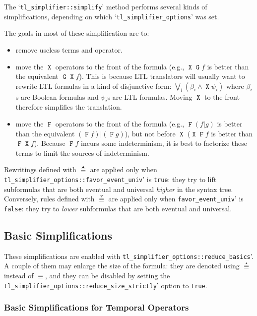 \documentclass[a4paper,twoside,10pt,DIV=12]{scrreprt}
\DeclareMathOperator{\F}{\texttt{F}}
\DeclareMathOperator{\G}{\texttt{G}}
\DeclareMathOperator{\X}{\texttt{X}}
\newcommand{\OR}{\mathbin{\texttt{|}}}
\newcommand{\0}{\texttt{0}}
\newcommand{\1}{\texttt{1}}
\newcommand{\equiV}{\stackrel{\star}{\equiv}}
\newcommand{\equivEU}{\stackrel{\blacktriangleup}{\equiv}}
\newcommand{\equivNeu}{\stackrel{\smalltriangledown}{\equiv}}
\begin{document}
The `\verb|tl_simplifier::simplify|' method performs several kinds of
simplifications, depending on which `\verb|tl_simplifier_options|'
was set.

The goals in most of these simplification are to:
\begin{itemize}
\item remove useless terms and operator.
\item move the $\X$ operators to the front of the formula (e.g., $\X\G
  f$ is better than the equivalent $\G\X f$).  This is because LTL
  translators will usually want to rewrite LTL formulas in
  a kind of disjunctive form: $\displaystyle\bigvee_i
  \left(\beta_i\land\X\psi_i\right)$ where $\beta_i$s are Boolean
  formulas and $\psi_i$s are LTL formulas.  Moving $\X$ to the
  front therefore simplifies the translation.
\item move the $\F$ operators to the front of the formula (e.g., $\F(f
  \OR g)$ is better than the equivalent $(\F f)\OR (\F g)$), but not
  before $\X$ ($\X\F f$ is better than $\F\X f$).  Because $\F f$
  incurs some indeterminism, it is best to factorize these terms to
  limit the sources of indeterminism.
\end{itemize}

Rewritings defined with $\equivEU$ are applied only when
\verb|tl_simplifier_options::favor_event_univ|' is \texttt{true}:
they try to lift subformulas that are both eventual and universal
\emph{higher} in the syntax tree.  Conversely, rules defined with $\equivNeu$
are applied only when \verb|favor_event_univ|' is \texttt{false}: they
try to \textit{lower} subformulas that are both eventual and universal.

\subsection{Basic Simplifications}\label{sec:basic-simp}

These simplifications are enabled with
\verb|tl_simplifier_options::reduce_basics|'.  A couple of them may
enlarge the size of the formula: they are denoted using $\equiV$
instead of $\equiv$, and they can be disabled by setting the
\verb|tl_simplifier_options::reduce_size_strictly|' option to
\texttt{true}.

\subsubsection{Basic Simplifications for Temporal Operators}
\label{sec:basic-simp-ltl}
\end{document}
